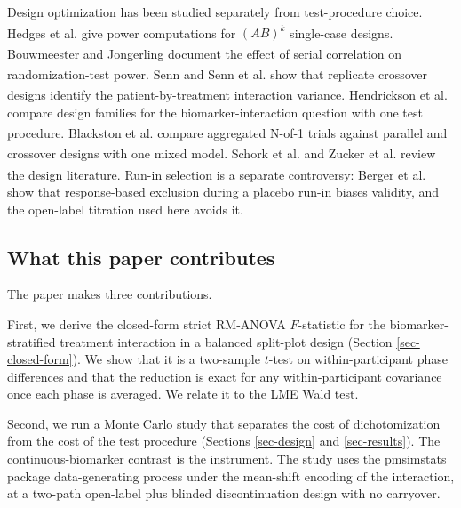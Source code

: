 \documentclass[
  11pt,
]{article}
\begin{document}
Design optimization has been studied separately from
test-procedure choice. Hedges et al.\textsuperscript{} give power computations for
\((AB)^k\) single-case designs. Bouwmeester and Jongerling\textsuperscript{} document the effect
of serial correlation on randomization-test power.
Senn\textsuperscript{} and Senn et al.\textsuperscript{} show that replicate
crossover designs identify the patient-by-treatment interaction
variance. Hendrickson et al.\textsuperscript{} compare design families for the
biomarker-interaction question with one test procedure.
Blackston et al.\textsuperscript{} compare aggregated N-of-1
trials against parallel and crossover designs with one mixed
model. Schork et al.\textsuperscript{} and Zucker et al.\textsuperscript{} review the design
literature. Run-in selection is a separate controversy:
Berger et al.\textsuperscript{} show that response-based exclusion during a
placebo run-in biases validity, and the open-label titration used
here avoids it.

\subsection{What this paper contributes}\label{what-this-paper-contributes}

The paper makes three contributions.

First, we derive the closed-form strict RM-ANOVA \(F\)-statistic for
the biomarker-stratified treatment interaction in a balanced
split-plot design (Section \ref{sec-closed-form}). We show that it
is a two-sample \(t\)-test on within-participant phase differences and
that the reduction is exact for any within-participant covariance
once each phase is averaged. We relate it to the LME Wald test.

Second, we run a Monte Carlo study that separates the cost of
dichotomization from the cost of the test procedure (Sections
\ref{sec-design} and \ref{sec-results}). The continuous-biomarker
contrast is the instrument. The study uses the pmsimstats package
data-generating process under the mean-shift encoding of the
interaction, at a two-path open-label plus blinded discontinuation
design with no carryover.
\end{document}
